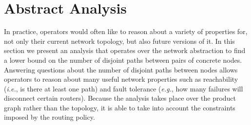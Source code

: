 \documentclass[numbers, 10pt, preprint]{sigplanconf}
\newcommand{\EG}{\emph{e.g.}}
\newcommand{\IE}{\emph{i.e.}}
\begin{document}
%
%
%
%


\section{Abstract Analysis}
\label{sec:analysis}

In practice, operators would often like to reason about a variety of properties for, not only their current network topology, but also future versions of it.
In this section we present an analysis that operates over the network abstraction to find a lower bound on the number of disjoint paths between pairs of concrete nodes. Answering questions about the number of disjoint paths between nodes allows operators to reason about many useful network properties such as reachability (\IE, is there at least one path) and fault tolerance (\EG, how many failures will disconnect certain routers). Because the analysis takes place over the product graph rather than the topology, it is able to take into account the constraints imposed by the routing policy.


\newcommand{\inference}[7]{
    \node[draw, anchor=west] at (#1 + .5, 2.5 / 2) {#3};
    \node[anchor=east] at (#1 - .4, 2.5 / 2) {\textbf{#5}};
    \node at (#1 + .34, .6 + .2) {#6};
    \node at (#1 + .34, 1.9 - .2) {#7};
    \node at (#1, -.6) {#2};
    \node at (#1, 2.5 + .4 + .2) {#4};
    \draw [] (#1, 2.5 - .2) circle [radius=0.4] node {$n$};
    \draw [] (#1, .2) circle [radius=0.4] node {$m$};
    \draw [->] (#1, .4 + .2) -- (#1, 2.5 - .4 - .2);
}

\newcommand{\inferencenobox}[7]{
    \node[anchor=west] at (#1 + .1, 1.25) {#3};
    \node[anchor=east] at (#1 - .4, 1.25) {\textbf{#5}};
    \node at (#1 + .34, .6) {#6};
    \node at (#1 + .34, 1.9) {#7};
    \node at (#1, -.6) {#2};
    \node at (#1, 2.5 + .4 + .2) {#4};
    \draw [] (#1, 2.5 - .2) circle [radius=0.4] node {$n$};
    \draw [] (#1, .2) circle [radius=0.4] node {$m$};
    \draw [->] (#1, .2 + .4) -- (#1, 2.5 - .4 - .2);
}

\newcommand{\inferencetwo}[1]{
    \node[draw, anchor=west] at (#1 + 2, 1.25) {$e_i > 0$};
    \node[anchor=east] at (#1 - .4, 1.25) {\textbf{I-striping}};
    \node at (#1 - 1 - .11, .6) {$e_1$};
    \node at (#1 + .11, 1.5) {$e_2$};
    \node at (#1 + 2 + .11, .6) {$e_3$};
    \node at (#1 + .11 + .8, 1.5) {$e_4$};
    \node at (#1 - 1, -.8) {L$_m(j,k)$};
    \node at (#1 +. 5, 2.9) {S$_n(min(j*k,g),1)$};
    \node at (#1 + 2, -.8) {S$_o\big( min(j, g *\frac{e_4}{e_3}),1\big)$};
    \node at (#1, 3.3) {};
    \draw [] (#1 + .5, 2.01) circle [radius=0.4] node {$n$};
    \draw [] (#1 - 1, 0) circle [radius=0.4] node {$m$};
    \draw [] (#1 + 2, 0) circle [radius=0.4] node {$o$};
    \draw [->] (#1 - 1, .4) -- (#1 + .5, 2 - .4);
    \draw [<-] (#1 + 2, .4) -- (#1 + .5, 2 - .4);
}
\end{document}
